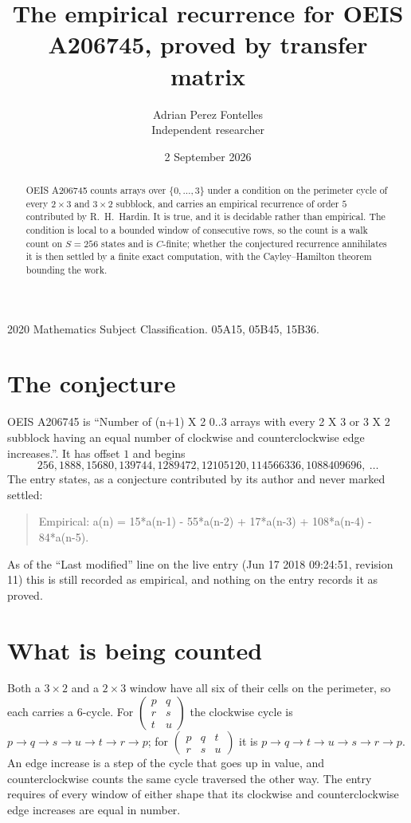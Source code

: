 \documentclass[11pt,a4paper]{article}
\title{The empirical recurrence for OEIS A206745, proved by transfer matrix}
\author{Adrian Perez Fontelles\\ \small Independent researcher}
\date{2 September 2026}
\theoremstyle{plain}
\theoremstyle{definition}
\begin{document}
\maketitle

\begin{abstract}
OEIS A206745 counts arrays over $\{0,\dots,3\}$ under a condition on the perimeter cycle of
every $2\times3$ and $3\times2$ subblock, and carries an empirical recurrence of order $5$ contributed by
R.~H.~Hardin. It is true, and it is decidable rather than empirical. The condition is local to
a bounded window of consecutive rows, so the count is a walk count on $S=256$ states and is
$C$-finite; whether the conjectured recurrence annihilates it is then settled by a finite exact
computation, with the Cayley--Hamilton theorem bounding the work.
\end{abstract}

\noindent\small 2020 Mathematics Subject Classification. 05A15, 05B45, 15B36.\normalsize

\section{The conjecture}

OEIS A206745 is ``Number of (n+1) X 2 0..3 arrays with every 2 X 3 or 3 X 2 subblock having an equal number of clockwise and counterclockwise edge increases.''. It has offset $1$ and begins
\[
256, 1888, 15680, 139744, 1289472, 12105120, 114566336, 1088409696,\ \dots
\]
The entry states, as a conjecture contributed by its author and never marked settled:
\begin{quote}
Empirical: a(n) = 15*a(n-1) - 55*a(n-2) + 17*a(n-3) + 108*a(n-4) - 84*a(n-5).
\end{quote}
As of the ``Last modified'' line on the live entry (Jun 17 2018 09:24:51, revision 11) this is still
recorded as empirical, and nothing on the entry records it as proved.

\section{What is being counted}

Both a $3\times2$ and a $2\times3$ window have all six of their cells on the
perimeter, so each carries a $6$-cycle. For
$\begin{pmatrix}p&q\\r&s\\t&u\end{pmatrix}$ the clockwise cycle is
$p\to q\to s\to u\to t\to r\to p$; for
$\begin{pmatrix}p&q&t\\r&s&u\end{pmatrix}$ it is
$p\to q\to t\to u\to s\to r\to p$. An edge increase is a step of the cycle that goes up in
value, and counterclockwise counts the same cycle traversed the other way. The entry requires
of every window of either shape that its clockwise and counterclockwise edge increases are equal in number.
\end{document}
